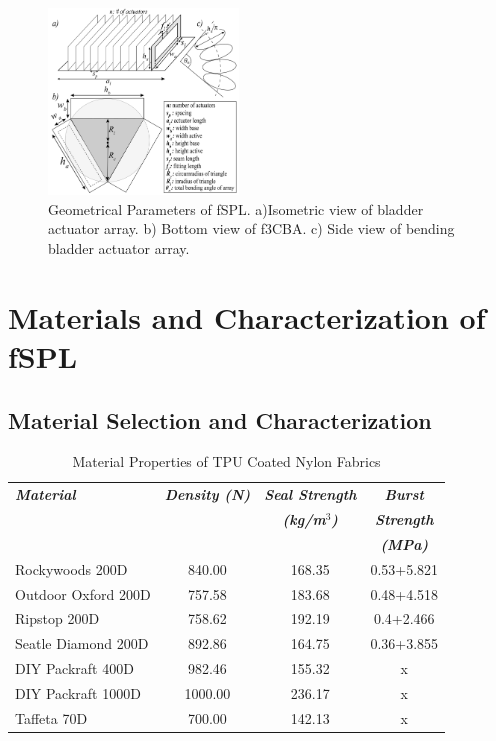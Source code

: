 \documentclass[letterpaper, 10 pt, conference]{ieeeconf}  %
\begin{document}
\begin{figure}[b!]
\centering
\includegraphics[width=0.45\textwidth]{Figures/geom_param_v5}
\caption{Geometrical Parameters of fSPL. a)Isometric view of bladder actuator array. b) Bottom view of f3CBA. c) Side view of bending bladder actuator array.}
\label{fig:geom_param}
\vspace{-1.5em}
\end{figure}



\section{ Materials and Characterization of fSPL} 

\subsection{Material Selection and Characterization}
\label{sec:mat_select}


\begin{table}[b!]
\caption{Material Properties of TPU Coated Nylon Fabrics} 
\label{tab:materialproperty_table}
	\begin{tabularx}{0.48\textwidth}{l|c|c|c}   \toprule\toprule
    \centering
    \small
    \setlength\tabcolsep{11pt}
	\textbf{\emph{Material}} & \textbf{\emph{Density (N) }} & \textbf{\emph{Seal Strength}} & \textbf{\emph{Burst }} \\[-1pt]
                             &                              & \textbf{\emph{(kg/m$^3$)}} & \textbf{\emph{Strength}}\\
                             &                              &                            & \textbf{\emph{(MPa)}}\\\midrule
	Rockywoods 200D &840.00 &168.35 & 0.53+5.821 \\
    Outdoor Oxford 200D  &757.58 &  183.68 & 0.48+4.518\\
    Ripstop 200D &758.62 & 192.19 & 0.4+2.466\\
    Seatle Diamond 200D &892.86 & 164.75 & 0.36+3.855\\
    DIY Packraft 400D & 982.46& 155.32 & x\\
    DIY Packraft 1000D &1000.00 & 236.17 & x\\
    Taffeta 70D &700.00& 142.13 & x\\\bottomrule 
    \hline
	\end{tabularx}
\end{table}
\end{document}
